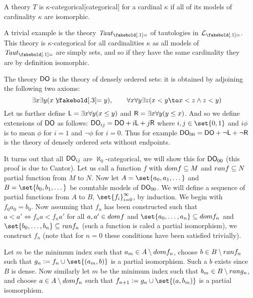 \bdefn

    A theory $T$ is {\emphcolor $\kappa$-categorical}[categorical] for a cardinal $\kappa$ if all of its models of cardinality $\kappa$ are isomorphic.

\edefn

\bexam

    A trivial example is the theory ${\it Taut}_{\eq}$ of tautologies in ${\cal L}_{\eq}$.
    This theory is $\kappa$-categorical for all cardinalities $\kappa$ as all models of ${\it Taut}_{\eq}$ are simply sets, and so if they have the same cardinality they are by definition isomorphic.

\eexam

\bexam

    The theory ${\sf DO}$ is the theory of densely ordered sets: it is obtained by adjoining the following two axioms:
    $$ \exists x\exists y(x\neqb y),\qquad \forall x\forall y\exists z(x<y\to x<z\land z<y) $$
    Let us further define ${\sf L}=\exists x\forall y(x\leq y)$ and ${\sf R}=\exists x\forall y(y\leq x)$.
    And so we define extensions of ${\sf DO}$ as follows: ${\sf DO}_{ij}={\sf DO}+i{\sf L}+j{\sf R}$ where $i,j\in\set{0,1}$ and $i\phi$ is to mean $\phi$ for $i=1$ and $\neg\phi$ for $i=0$.
    Thus for example ${\sf DO}_{00}={\sf DO}+\neg{\sf L}+\neg{\sf R}$ is the theory of densely ordered sets without endpoints.

    It turns out that all ${\sf DO}_{ij}$ are $\aleph_0$-categorical, we will show this for ${\sf DO}_{00}$ (this proof is due to Cantor).
    Let us call a function $f$ with ${\sl dom}f\subseteq M$ and ${\sl ran}f\subseteq N$ {\emphcolor partial function} from $M$ to $N$.
    Now let $A=\set{a_0,a_1,\dots}$ and $B=\set{b_0,b_1,\dots}$ be countable models of ${\sf DO}_{00}$.
    We will define a sequence of partial functions from $A$ to $B$, $\set{f_i}_{i=0}^\infty$, by induction.
    We begin with $f_0a_0=b_0$.
    Now assuming that $f_n$ has been constructed such that $a<a'\iff f_na<f_na'$ for all $a,a'\in{\sl dom}f$ and $\set{a_0,\dots,a_n}\subseteq{\sl dom}f_n$ and $\set{b_0,\dots,b_n}\subseteq{\it ran}f_n$
    (such a function is caled a {\emphcolor partial isomorphism}), we construct $f_n$ (note that for $n=0$ these conditions have been satisfied trivially).

    Let $m$ be the minimum index such that $a_m\in A\setminus{\sl dom}f_n$, choose $b\in B\setminus{\sl ran}f_n$ such that $g_n\coloneqq f_n\cup\set{(a_m,b)}$ is a partial isomorphism.
    Such a $b$ exists since $B$ is dense.
    Now similarly let $m$ be the minimum index such that $b_m\in B\setminus{\sl ran}g_n$, and choose $a\in A\setminus{\sl dom}f_n$ such that $f_{n+1}\coloneqq g_n\cup\set{(a,b_m)}$ is a partial isomorphism.

